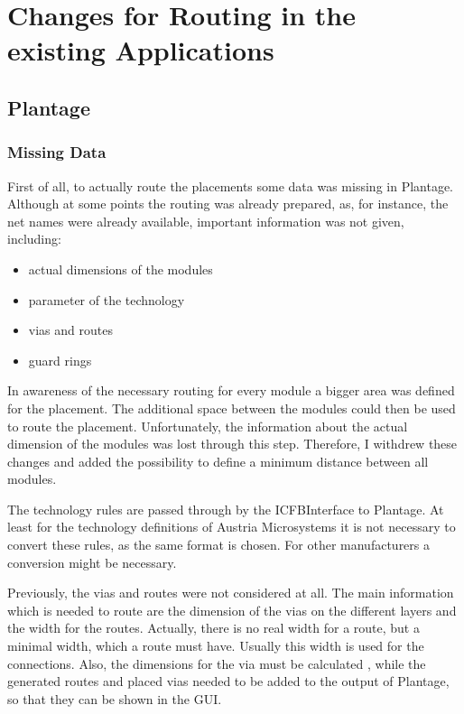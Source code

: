 \section{Changes for Routing in the existing Applications}

\subsection{Plantage}

\subsubsection{Missing Data}
First of all, to actually route the placements some data was missing in Plantage. Although at some points the routing was already prepared, as, for instance, the net names were already available, important information was not given, including:
\begin{itemize}
\item actual dimensions of the modules
\item parameter of the technology
\item vias and routes
\item guard rings
\end{itemize}

In awareness of the necessary routing for every module a bigger area was defined for the placement. The additional space between the modules could then be used to route the placement. Unfortunately, the information about the actual dimension of the modules was lost through this step. Therefore, I withdrew these changes and added the possibility to define a minimum distance between all modules.

The technology rules are passed through by the ICFBInterface to Plantage. At least for the technology definitions of Austria Microsystems it is not necessary to convert these rules, as the same format is chosen. For other manufacturers a conversion might be necessary.

Previously, the vias and routes were not considered at all. The main information which is needed to route are the dimension of the vias on the different layers and the width for the routes. Actually, there is no real width for a route, but a minimal width, which a route must have. Usually this width is used for the connections. Also, the dimensions for the via must be calculated , while the generated routes and placed vias needed to be added to the output of Plantage, so that they can be shown in the GUI.

